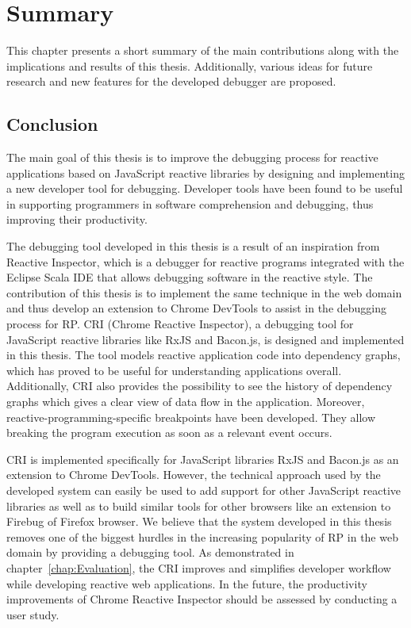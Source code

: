 \chapter{Summary} \label{chap:Summary}
This chapter presents a short summary of the main contributions along with the implications and results of this thesis. Additionally, various ideas for future research and new features for the developed debugger are proposed.

\section{Conclusion}
The main goal of this thesis is to improve the debugging process for reactive applications based on JavaScript reactive libraries by designing and implementing a new developer tool for debugging. Developer tools have been found to be useful in supporting programmers in software comprehension and debugging, thus improving their productivity.


The debugging tool developed in this thesis is a result of an inspiration from Reactive Inspector, which is a debugger for reactive programs integrated with the Eclipse Scala IDE that allows debugging software in the reactive style.
The contribution of this thesis is to implement the same technique in the web domain and thus develop an extension to Chrome DevTools to assist in the debugging process for RP.
CRI (Chrome Reactive Inspector), a debugging tool for JavaScript reactive libraries like RxJS and Bacon.js, is designed and implemented in this thesis. The tool models reactive application code into dependency graphs, which has proved to be useful for understanding applications overall. Additionally, CRI also provides the possibility to see the history of dependency graphs which gives a clear view of data flow in the application. Moreover, reactive-programming-specific breakpoints have been developed. They allow breaking the program execution as soon as a relevant event occurs.

CRI is implemented specifically for JavaScript libraries RxJS and Bacon.js as an extension to Chrome DevTools. However, the technical approach used by the developed system can easily be used to add support for other JavaScript reactive libraries as well as to build similar tools for other browsers like an extension to Firebug of Firefox browser.
We believe that the system developed in this thesis removes one of the biggest hurdles in the increasing popularity of RP in the web domain by providing a debugging tool.  As demonstrated in chapter~\ref{chap:Evaluation}, the CRI improves and simplifies developer workflow while developing reactive web applications. In the future, the productivity improvements of Chrome Reactive Inspector should be assessed by conducting a user study.


